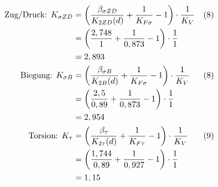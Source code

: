 \begin{itemize}
	\begin{align*}
		\text{Zug/Druck: } K_{\sigma ZD} &= \left( \frac{\beta_{\sigma ZD}}{K_{2ZD} (d)} + \frac{1}{K_{F\sigma}} -1\right) \cdot \frac{1}{K_V} & (8) \\
		&= \left( \frac{2,748}{1} + \frac{1}{0,873} -1\right) \cdot \frac{1}{1} \\
		&= 2,893 \\
		\text{Biegung: } K_{\sigma B} &= \left( \frac{\beta_{\sigma B}}{K_{2B}(d)} + \frac{1}{K_{F\sigma}} -1\right) \cdot \frac{1}{K_V} & (8) \\
		&= \left( \frac{2,5}{0,89} + \frac{1}{0,873} -1\right) \cdot \frac{1}{1} \\
		&= 2,954 \\
		\text{Torsion: } K_{\tau} &= \left( \frac{\beta_{\tau}}{K_{2\tau}(d)} + \frac{1}{K_{F\tau}} -1\right) \cdot \frac{1}{K_V} & (9) \\
		&= \left( \frac{1,744}{0,89} + \frac{1}{0,927} -1\right) \cdot \frac{1}{1} \\
		&= 1,15 
	\end{align*}
\end{itemize}
